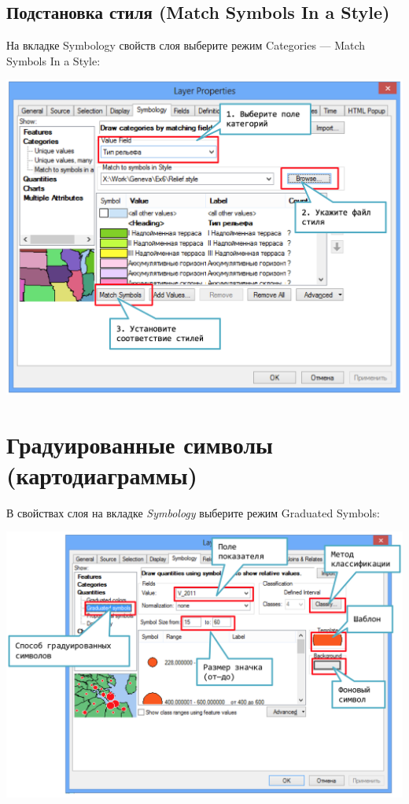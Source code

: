 \documentclass[]{book}
\theoremstyle{definition}
\theoremstyle{definition}
\theoremstyle{definition}
\theoremstyle{remark}
\begin{document}
\hypertarget{manual-vector-match}{%
\subsection{Подстановка стиля (Match Symbols In a
Style)}\label{manual-vector-match}}

На вкладке Symbology свойств слоя выберите режим Categories --- Match
Symbols In a Style:

\includegraphics{images/Appendix/image19.png}

\hypertarget{manual-vector-diagrams}{%
\section{Градуированные символы
(картодиаграммы)}\label{manual-vector-diagrams}}

В свойствах слоя на вкладке \emph{Symbology} выберите режим Graduated
Symbols:

\includegraphics{images/Appendix/image20.png}
\end{document}
